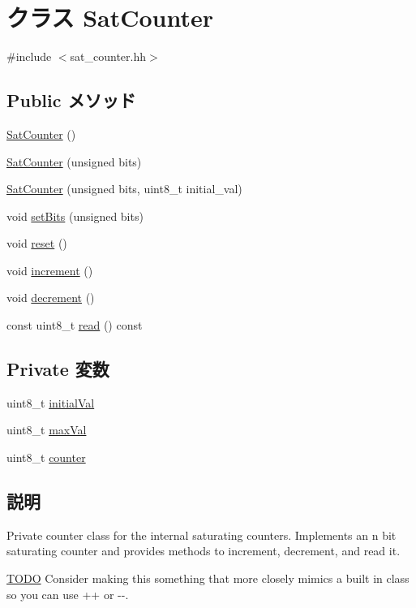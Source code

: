 \hypertarget{classSatCounter}{
\section{クラス SatCounter}
\label{classSatCounter}
}


{\ttfamily \#include $<$sat\_\-counter.hh$>$}\subsection*{Public メソッド}
\begin{DoxyCompactItemize}
\item 
\hyperlink{classSatCounter_af4fd8672acdaf7df4e65f0bf22569d75}{SatCounter} ()
\item 
\hyperlink{classSatCounter_a5d3cda6b8fda91df5a98232d3fe7199f}{SatCounter} (unsigned bits)
\item 
\hyperlink{classSatCounter_a3ecba692e26af744ab286b255ed62786}{SatCounter} (unsigned bits, uint8\_\-t initial\_\-val)
\item 
void \hyperlink{classSatCounter_a1c3a3b06f3b7b6f57bf4bffd65373026}{setBits} (unsigned bits)
\item 
void \hyperlink{classSatCounter_ad20897c5c8bd47f5d4005989bead0e55}{reset} ()
\item 
void \hyperlink{classSatCounter_aeb2624c7a86b765725fd80cd426e147d}{increment} ()
\item 
void \hyperlink{classSatCounter_af998f1201f6ff5160003144e5818b8ba}{decrement} ()
\item 
const uint8\_\-t \hyperlink{classSatCounter_a3f7adb392ec312df48dac5e14bb966be}{read} () const 
\end{DoxyCompactItemize}
\subsection*{Private 変数}
\begin{DoxyCompactItemize}
\item 
uint8\_\-t \hyperlink{classSatCounter_ae248c87ae614be914debb1d07e329ad7}{initialVal}
\item 
uint8\_\-t \hyperlink{classSatCounter_a31d556ff4884898b803cca93ab0e4561}{maxVal}
\item 
uint8\_\-t \hyperlink{classSatCounter_a0480b812cba9c1d9c71a5fb1071bd0fc}{counter}
\end{DoxyCompactItemize}


\subsection{説明}
Private counter class for the internal saturating counters. Implements an n bit saturating counter and provides methods to increment, decrement, and read it. \begin{Desc}
\item[\hyperlink{todo__todo000049}{TODO}]Consider making this something that more closely mimics a built in class so you can use ++ or -\/-\/. \end{Desc}


